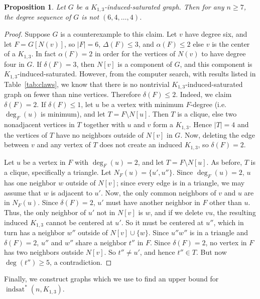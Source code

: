 \documentclass[12pt]{amsart}
\theoremstyle{plain}
\newtheorem{prop}[thm]{Proposition}
\theoremstyle{definition}
\theoremstyle{remark}
\newcommand{\sis}[2]{\ensuremath{{\operatorname{indsat}}^*(#1,#2)}\xspace}
\newcommand{\claw}{\ensuremath{K_{1,3}}\xspace}
\begin{document}
{\begin{prop}\label{644}
Let $G$ be a \claw-induced-saturated graph. Then for any $n \geq 7$, the degree sequence of $G$ is \emph{not} $(6,4,\ldots,4)$.
\end{prop}
\begin{proof}
Suppose $G$ is a counterexample to this claim. Let $v$ have degree six, and let $F=G[N(v)]$, so $|F|=6$, $\Delta(F) \leq 3$, and $\alpha(F) \leq 2$ else $v$ is the center of a \claw. In fact $\alpha(F)=2$ in order for the vertices of $N(v)$ to have degree four in $G$.
If $\delta(F)=3$, then $N[v]$ is a component of $G$, and this component is \claw-induced-saturated.
However, from the computer search, with results listed in Table~\ref*{tab:claws}, we know that there is no nontrivial \claw-induced-saturated graph on fewer than nine vertices.
Therefore $\delta(F) \leq 2$.
Indeed, we claim $\delta(F)=2$.
If $\delta(F) \leq 1$, let $u$ be a vertex with minimum $F$-degree (i.e. $\deg_F(u)$ is minimum), and let $T=F\setminus N[u]$.
Then $T$ is a clique, else two nonadjacent vertices in $T$ together with $u$ and $v$ form a \claw.
Hence $|T|=4$ and the vertices of $T$ have no neighbors outside of $N[v]$ in $G$.
Now, deleting the edge between $v$ and any vertex of $T$ does not create an induced \claw, so $\delta(F)=2$.

Let $u$ be a vertex in $F$ with $\deg_F(u)=2$, and let $T=F\setminus N[u]$.
As before, $T$ is a clique, specifically a triangle.   Let $N_F(u) = \{u', u''\}$.
Since $\deg_F(u)=2$, $u$ has one neighbor $w$ outside of $N[v]$; since every edge is in a triangle, we may assume that $w$ is adjacent to $u'$.  Now, the only common neighbors of $v$ and $u$ are in $N_F(u)$.
Since $\delta(F)=2$, $u'$ must have another neighbor in $F$ other than $u$.  Thus, the only neighbor of $u'$ not in $N[v]$ is $w$, and if we delete $vu$, the resulting induced \claw cannot be centered at $u'$.  So it must be centered at $u''$, which in turn has a neighbor $w''$ outside of $N[v] \cup \{w\}$.  Since $u''w''$ is in a triangle and $\delta(F) = 2$, $u''$ and $w''$ share a neighbor $t''$ in $F$.
Since $\delta(F) = 2$, no vertex in $F$ has two neighbors outside $N[v]$.  So $t'' \neq u'$, and hence $t'' \in T$.
But now $\deg(t'') \geq 5$, a contradiction.
\end{proof}


Finally, we construct graphs which we use to find an upper bound for $\sis{n}{\claw}$.
}
\end{document}

